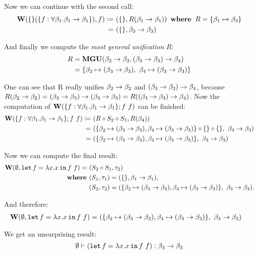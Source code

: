 \documentclass[a4paper,oneside]{memoir}
\begin{document}
Now we can continue with the second call:
\begin{align*}
\operatorname{\textbf{W}}(\{\}(\{f:\forall \beta_1 . \beta_1 \rightarrow \beta_1 \}), f) \coloneqq ~ & (\{\}, R(\beta_1 \rightarrow \beta_1) ) 
~ \operatorname{\textbf{where~}} R = \{\beta_1 \mapsto \beta_3\} \\
= ~ &  (\{\}, \beta_3 \rightarrow \beta_3)
\end{align*}

And finally we compute the \textit{most general unification} $R$:
\begin{align*}
R & = \operatorname{\textbf{MGU}}(\beta_2 \rightarrow \beta_2, (\beta_3 \rightarrow \beta_3) \rightarrow \beta_4 ) \\
  & = \{ \beta_2 \mapsto (\beta_3 \rightarrow \beta_3),~ \beta_4 \mapsto (\beta_3 \rightarrow \beta_3) \}
\end{align*}

One can see that R really unifies $\beta_2 \rightarrow \beta_2$ and $(\beta_3 \rightarrow \beta_3) \rightarrow \beta_4$,
because $R(\beta_2 \rightarrow \beta_2) = (\beta_3 \rightarrow \beta_3) \rightarrow (\beta_3 \rightarrow \beta_3) = R((\beta_3 \rightarrow \beta_3) \rightarrow \beta_4)$. Now the computation of $\operatorname{\textbf{W}}(\{f:\forall \beta_1 . \beta_1 \rightarrow \beta_1 \}; f~f)$ can be finished:
\begin{align*}
\operatorname{\textbf{W}}(\{f:\forall \beta_1 . \beta_1 \rightarrow \beta_1 \}; f~f) 
\coloneqq ~ & (R \circ S_2 \circ S_1, R(\beta_4) ) \\
    = ~ & (\{ \beta_2 \mapsto (\beta_3 \rightarrow \beta_3), \beta_4 \mapsto (\beta_3 \rightarrow \beta_3) \} \circ \{\} \circ \{\},~ \beta_3 \rightarrow \beta_3 )\\ 
    = ~ & (\{ \beta_2 \mapsto (\beta_3 \rightarrow \beta_3), \beta_4 \mapsto (\beta_3 \rightarrow \beta_3) \}, ~ \beta_3 \rightarrow \beta_3 ) 
\end{align*}

Now we can compute the final result:
\begin{align*}
\operatorname{\textbf{W}}(\emptyset, \texttt{let} \, f = \lambda x . x \, \texttt{in} \, f~f) = ~ & (S_2 \circ S_1, \tau_2) \\
\operatorname{\textbf{where~}} & (S_1, \tau_1) = (\{\}, \beta_1 \rightarrow \beta_1 ), \\
       & (S_2, \tau_2) = (\{ \beta_2 \mapsto (\beta_3 \rightarrow \beta_3), \beta_4 \mapsto (\beta_3 \rightarrow \beta_3) \}, ~ \beta_3 \rightarrow \beta_3 ).
\end{align*}

And therefore:
\begin{align*}
\operatorname{\textbf{W}}(\emptyset, \texttt{let} \, f = \lambda x . x \, \texttt{in} \, f~f) = ~ & (\{ \beta_2 \mapsto (\beta_3 \rightarrow \beta_3), \beta_4 \mapsto (\beta_3 \rightarrow \beta_3) \},~ \beta_3 \rightarrow \beta_3)
\end{align*}

We get an unsurprising result:
$$\emptyset \vdash (\texttt{let} \, f = \lambda x . x \, \texttt{in} \, f~f) : \beta_3 \rightarrow \beta_3$$
\end{document}
